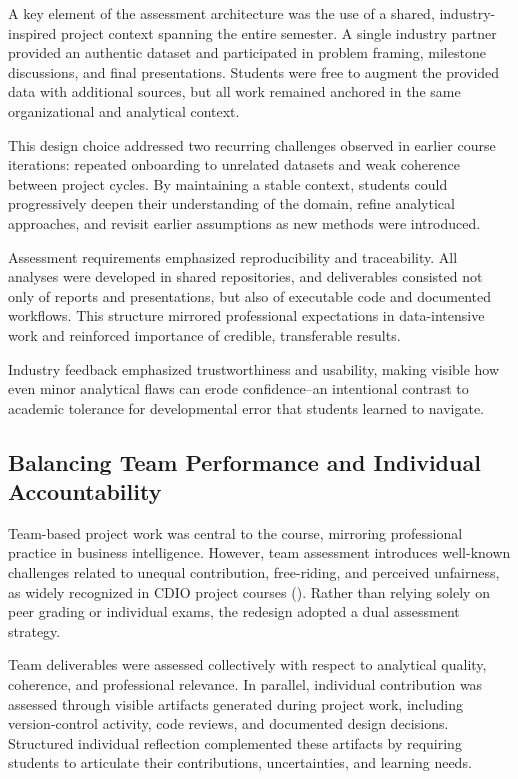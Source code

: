 A key element of the assessment architecture was the use of a shared, industry-inspired project context spanning the entire semester. A single industry partner provided an authentic dataset and participated in problem framing, milestone discussions, and final presentations. Students were free to augment the provided data with additional sources, but all work remained anchored in the same organizational and analytical context.

This design choice addressed two recurring challenges observed in earlier course iterations: repeated onboarding to unrelated datasets and weak coherence between project cycles. By maintaining a stable context, students could progressively deepen their understanding of the domain, refine analytical approaches, and revisit earlier assumptions as new methods were introduced.

Assessment requirements emphasized reproducibility and traceability. All analyses were developed in shared repositories, and deliverables consisted not only of reports and presentations, but also of executable code and documented workflows. This structure mirrored professional expectations in data-intensive work and reinforced importance of credible, transferable results.

Industry feedback emphasized trustworthiness and usability, making visible how even minor analytical flaws can erode confidence--an intentional contrast to academic tolerance for developmental error that students learned to navigate.

\subsection{Balancing Team Performance and Individual Accountability}

Team-based project work was central to the course, mirroring professional practice in business intelligence. However, team assessment introduces well-known challenges related to unequal contribution, free-riding, and perceived unfairness, as widely recognized in CDIO project courses (\cite{spooner2008teamwork}). Rather than relying solely on peer grading or individual exams, the redesign adopted a dual assessment strategy.

Team deliverables were assessed collectively with respect to analytical quality, coherence, and professional relevance. In parallel, individual contribution was assessed through visible artifacts generated during project work, including version-control activity, code reviews, and documented design decisions. Structured individual reflection complemented these artifacts by requiring students to articulate their contributions, uncertainties, and learning needs.

